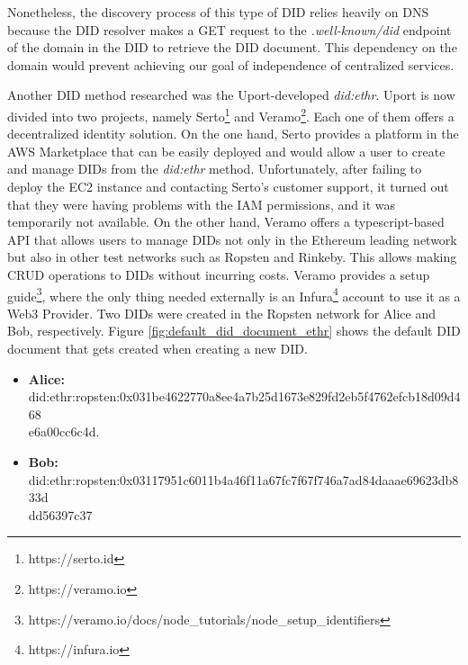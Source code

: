 Nonetheless, the discovery process of this type of DID relies heavily on DNS because the DID resolver makes a GET request to the \emph{.well-known/did} endpoint of the domain in the DID to retrieve the DID document. This dependency on the domain would prevent achieving our goal of independence of centralized services. 

Another DID method researched was the Uport-developed \emph{did:ethr}. Uport is now divided into two projects, namely Serto\footnote{https://serto.id} and Veramo\footnote{https://veramo.io}. Each one of them offers a decentralized identity solution. On the one hand, Serto provides a platform in the AWS Marketplace that can be easily deployed and would allow a user to create and manage DIDs from the \emph{did:ethr} method. Unfortunately, after failing to deploy the EC2 instance and contacting Serto's customer support, it turned out that they were having problems with the IAM permissions, and it was temporarily not available. On the other hand, Veramo offers a typescript-based API that allows users to manage DIDs not only in the Ethereum leading network but also in other test networks such as Ropsten and Rinkeby. This allows making CRUD operations to DIDs without incurring costs. Veramo provides a setup guide\footnote{https://veramo.io/docs/node\_tutorials/node\_setup\_identifiers}, where the only thing needed externally is an Infura\footnote{https://infura.io} account to use it as a Web3 Provider. Two DIDs were created in the Ropsten network for Alice and Bob, respectively. Figure \ref{fig:default_did_document_ethr} shows the default DID document that gets created when creating a new DID.

\begin{itemize}
  \item \textbf{Alice:} 
  did:ethr:ropsten:0x031be4622770a8ee4a7b25d1673e829fd2eb5f4762efcb18d09d468\\e6a00cc6c4d.
  \item \textbf{Bob:} 
did:ethr:ropsten:0x03117951c6011b4a46f11a67fc7f67f746a7ad84daaae69623db833d\\dd56397c37
\end{itemize}

